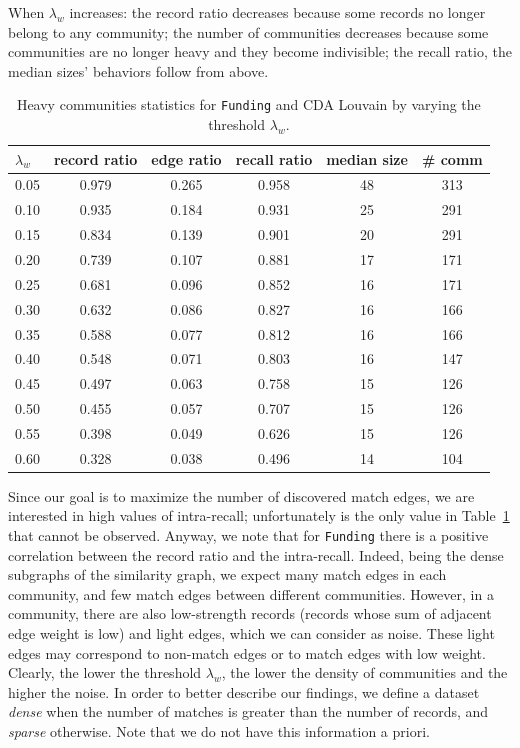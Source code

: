 \documentclass[sigconf, nonacm]{acmart}
\newcommand{\funding}{\texttt{Funding}\xspace}
\begin{document}
When $\lambda_w$ increases: the record ratio decreases because some records no longer belong to any community;  the number of communities %
decreases because some communities are no longer heavy and they become indivisible; the recall ratio, the median sizes' behaviors follow from above.

{\small
\begin{table}[h!]
\centering
\begin{tabular}{l c c c c c}
\hline
$\lambda_w$ & record ratio & edge ratio & recall ratio & median size & \# comm \\
\hline
0.05 & 0.979 & 0.265 & 0.958 & 48   & 313 \\
0.10 & 0.935 & 0.184 & 0.931 & 25   & 291 \\
0.15 & 0.834 & 0.139 & 0.901 & 20   & 291 \\
0.20 & 0.739 & 0.107 & 0.881 & 17   & 171 \\
0.25 & 0.681 & 0.096 & 0.852 & 16   & 171 \\
0.30 & 0.632 & 0.086 & 0.827 & 16   & 166 \\
0.35 & 0.588 & 0.077 & 0.812 & 16   & 166 \\
0.40 & 0.548 & 0.071 & 0.803 & 16   & 147 \\
0.45 & 0.497 & 0.063 & 0.758 & 15   & 126 \\
0.50 & 0.455 & 0.057 & 0.707 & 15   & 126 \\
0.55 & 0.398 & 0.049 & 0.626 & 15   & 126 \\
0.60 & 0.328 & 0.038 & 0.496 & 14   & 104 \\
\hline
\end{tabular}
\caption{Heavy communities statistics for \funding and CDA Louvain by varying the threshold $\lambda_w$.}
\label{tab:lambda_louvain}
\end{table}
}

Since our goal is to maximize the number of discovered match edges, we are interested in high values of intra-recall; unfortunately is the only value in Table~\ref{tab:lambda_louvain} that cannot be observed. Anyway, we note that for \funding there is a positive correlation between the record ratio and the intra-recall. Indeed, being the dense subgraphs of the similarity graph, we expect many match edges in each community, and few match edges between different communities. However, in a community, there are also low-strength records (records whose sum of adjacent edge weight is low) and light edges, which we can consider as noise. These light edges may correspond to non-match edges or to match edges with low weight. Clearly, the lower the threshold $\lambda_w$, the lower the density of communities and the higher the noise. In order to better describe our findings, we define a dataset \emph{dense} when the number of matches is greater than the number of records, and \emph{sparse} otherwise. Note that we do not have this information a priori.
\end{document}
